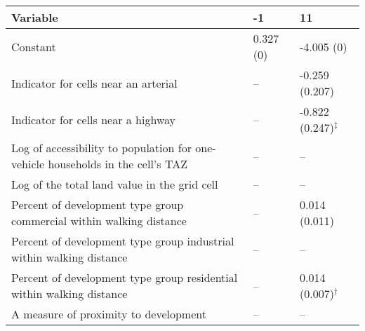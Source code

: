 
\begin{tabular}{p{3in}p{0.5in}p{0.5in}}
\hline\hline
Variable & -1 & 11 \\\hline
Constant & 0.327 (0) & -4.005 (0) \\
Indicator for cells near an arterial & -- & -0.259 (0.207) \\
Indicator for cells near a highway & -- & -0.822 (0.247)$^{\ddagger}$ \\
Log of accessibility to population for one-vehicle households in the cell's TAZ & -- & -- \\
Log of the total land value in the grid cell & -- & -- \\
Percent of development type group commercial within walking distance & -- & 0.014 (0.011) \\
Percent of development type group industrial within walking distance & -- & -- \\
Percent of development type group residential within walking distance & -- & 0.014 (0.007)$^{\dagger}$ \\
A measure of proximity to development & -- & -- \\
\hline\hline
\end{tabular}
